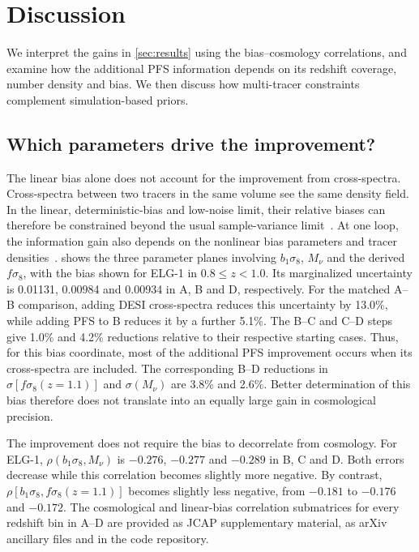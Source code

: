 \documentclass[a4paper,11pt]{article}
\newcommand{\revchange}[1]{{\color{RevisionColor}#1}}
\newcommand{\se}{\ensuremath{\sigma_{8}}\xspace}
\newcommand{\Mnu}{M_\nu}
\begin{document}
\section{Discussion}
\label{sec:discussion}

\revchange{We interpret the gains in \cref{sec:results} using the bias--cosmology
correlations, and examine how the additional PFS information depends
on its redshift coverage, number density and bias. We then discuss how
multi-tracer constraints complement simulation-based priors.}

\subsection{Which parameters drive the improvement?}
\label{sec:drivers}

\revchange{The linear bias alone does not account for the improvement from
cross-spectra.
Cross-spectra between two tracers in the same volume see the same
density field. In the linear, deterministic-bias and low-noise limit,
their relative biases can therefore be constrained beyond the usual sample-variance limit~\cite{Seljak:2008xr,McDonald:2008sh}. At one loop, the
information gain also depends on the nonlinear bias parameters
and tracer densities~\cite{Mergulhao:2023zso,Rubira:2025scu}.
\Cref{fig:fisher_contours}
shows the three parameter planes involving $b_1\se$,
$\Mnu$ and the derived $f\se$, with the bias shown for
ELG-1 in $0.8\leq z<1.0$. Its marginalized uncertainty
is 0.01131, 0.00984 and 0.00934 in A, B and D, respectively.
For the matched A--B comparison, adding DESI cross-spectra
reduces this uncertainty by 13.0\%, while adding PFS to B reduces
it by a further 5.1\%. The B--C and C--D steps give
1.0\% and 4.2\% reductions relative to their respective
starting cases. Thus, for this bias coordinate, most of the
additional PFS improvement occurs when its cross-spectra
are included. The corresponding B--D reductions in
$\sigma[f\se(z=1.1)]$ and $\sigma(\Mnu)$ are
3.8\% and 2.6\%. Better determination of this bias
therefore does not translate into an equally large gain
in cosmological precision.}

\revchange{The improvement does not require the bias to decorrelate from
cosmology. For ELG-1, $\rho(b_1\se,\Mnu)$ is $-0.276$, $-0.277$ and
$-0.289$ in B, C and D. Both errors decrease while this correlation
becomes slightly more negative. By contrast, $\rho[b_1\se,f\se(z=1.1)]$
becomes slightly less negative, from $-0.181$ to $-0.176$ and $-0.172$.
The cosmological and linear-bias correlation submatrices for every
redshift bin in A--D are provided as JCAP supplementary material, as
arXiv ancillary files and in the code repository.}
\end{document}
